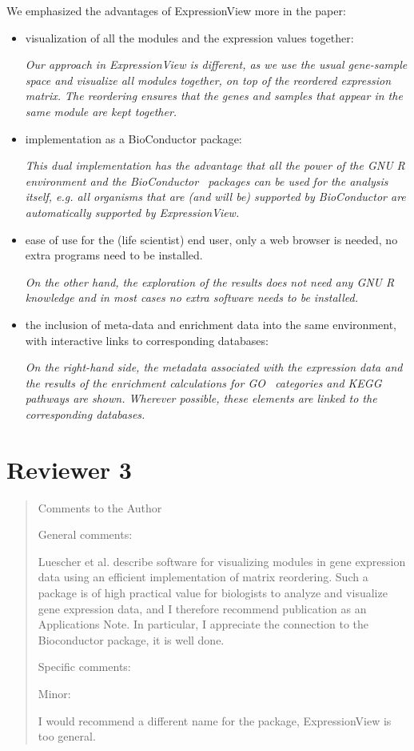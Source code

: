 \documentclass[a4paper]{article}
\newenvironment{myquote}{\begin{quote}\color{blue}}{\end{quote}}
\begin{document}
We emphasized the advantages of ExpressionView more in the paper:
\begin{itemize}
\item visualization of all the modules and the expression values
  together:

  \textsl{\noindent
    Our approach in ExpressionView is different,
    as we use the usual gene-sample space and visualize all modules
    together, on top of the reordered expression matrix. The reordering
    ensures that the genes and samples that appear in the same module are
    kept together.
  }
\item implementation as a BioConductor package:

  \textsl{\noindent
    This dual implementation has the advantage that all the power of the
    GNU R environment and the BioConductor~\citep{gentleman04} packages
    can be used for the analysis itself, e.g. all organisms that are (and
    will be) supported by BioConductor are automatically supported by
    ExpressionView. 
  }
\item ease of use for the (life scientist) end user, only a web browser is
  needed, no extra programs need to be installed.

  \textsl{\noindent
    On the other hand, the exploration of the results does
    not need any GNU R knowledge and in most cases no extra software needs to
    be installed.    
  }
\item the inclusion of meta-data and enrichment data into the same
  environment, with interactive links to corresponding databases:

  \textsl{\noindent
    On the right-hand side, the metadata
    associated with the expression data and the results of the
    enrichment calculations for GO~\citep{ashburner00} categories and
    KEGG~\citep{kanehisa04} pathways are shown. Wherever possible, these elements
    are linked to the corresponding databases.    
  }
\end{itemize}

\section*{Reviewer 3}

\begin{myquote}
Comments to the Author

General comments:

Luescher et al. describe software for visualizing modules in gene
expression data using an efficient implementation of matrix
reordering. Such a package is of high practical value for biologists
to analyze and visualize gene expression data, and I therefore
recommend publication as an Applications Note. In particular, I
appreciate the connection to the Bioconductor package, it is well
done.

Specific comments:

Minor:

I would recommend a different name for the package, ExpressionView is
too general.
\end{myquote}
\end{document}
